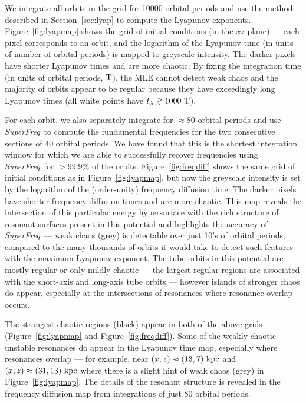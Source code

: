 \documentclass[letterpaper,12pt,preprint]{aastex}
\newcommand{\periods}{\ensuremath{{\rm T}}}
\newcommand{\project}[1]{\textsl{#1}}
\newcommand{\superfreq}{\project{SuperFreq}}
\begin{document}
We integrate all orbits in the grid for 10000 orbital periods and use the method described in Section~\ref{sec:lyap} to compute the Lyapunov exponents. Figure~\ref{fig:lyapmap} shows the grid of initial conditions (in the $xz$ plane) --- each pixel corresponds to an orbit, and the logarithm of the Lyapunov time (in units of number of orbital periods) is mapped to greyscale intensity. The darker pixels have shorter Lyapunov times and are more chaotic. By fixing the integration time (in units of orbital periods, $\periods$), the MLE cannot detect weak chaos and the majority of orbits appear to be regular because they have exceedingly long Lyapunov times (all white points have $t_\lambda \gtrsim 1000~\periods$). 

For each orbit, we also separately integrate for $\approx$80 orbital periods and use \superfreq\ to compute the fundamental frequencies for the two consecutive sections of 40 orbital periods. We have found that this is the shortest integration window for which we are able to successfully recover frequencies using \superfreq\ for $>$99.9\% of the orbits. Figure~\ref{fig:freqdiff} shows the same grid of initial conditions as in Figure~\ref{fig:lyapmap}, but now the greyscale intensity is set by the logarithm of the (order-unity) frequency diffusion time. The darker pixels have shorter frequency diffusion times and are more chaotic. This map reveals the intersection of this particular energy hypersurface with the rich structure of resonant surfaces present in this potential and highlights the accuracy of \superfreq\ --- weak chaos (grey) is detectable over just 10's of orbital periods, compared to the many thousands of orbits it would take to detect such features with the maximum Lyapunov exponent. The tube orbits in this potential are mostly regular or only mildly chaotic --- the largest regular regions are associated with the short-axis and long-axis tube orbits --- however islands of stronger chaos do appear, especially at the intersections of resonances where resonance overlap occurs. 

The strongest chaotic regions (black) appear in both of the above grids (Figure~\ref{fig:lyapmap} and Figure~\ref{fig:freqdiff}). Some of the weakly chaotic unstable resonances do appear in the Lyapunov time map, especially where resonances overlap --- for example, near $(x,z) \approx(13,7)~{\rm kpc}$ and $(x,z) \approx(31,13)~{\rm kpc}$ where there is a slight hint of weak chaos (grey) in Figure~\ref{fig:lyapmap}. The details of the resonant structure is revealed in the frequency diffusion map from integrations of just 80 orbital periods. 
\end{document}
